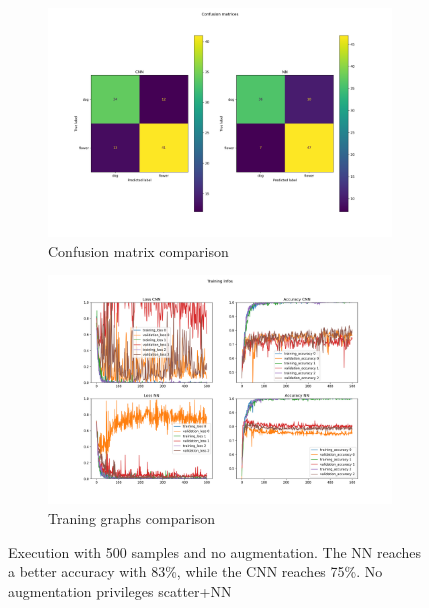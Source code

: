 \documentclass{report}
\begin{document}
\begin{figure}[t!]
  \centering
  \hspace{-2cm}
  \begin{subfigure}[t]{0.49\textwidth}
    \centering
    \includegraphics[width=1.3\textwidth]{8.500_noaug/conf_mat.png}
    \caption{Confusion matrix comparison}
    \label{fig:image-set5-sub1}
  \end{subfigure}
  \hspace{-0.5cm}
  \begin{subfigure}[t]{0.49\textwidth}
    \centering
    \includegraphics[width=1.3\textwidth]{8.500_noaug/training_infos.png}
    \caption{Traning graphs comparison}
    \label{fig:image-set5-sub2}
  \end{subfigure}

  \caption{Execution with 500 samples and no augmentation. The NN reaches a better accuracy with 83\%, while the CNN reaches 75\%. No augmentation privileges scatter+NN}
  \label{fig:image-set5}
\end{figure}
\end{document}
